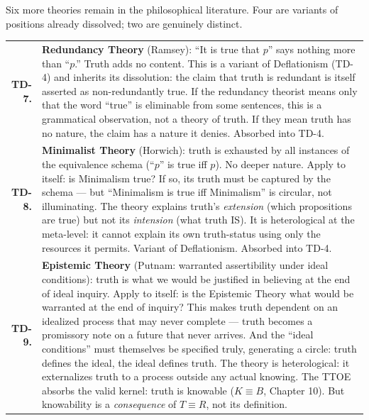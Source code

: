 \documentclass[10pt, openany, oneside]{book}
\renewcommand{\footnotesize}{\fontsize{8.5}{11}\selectfont}
\begin{document}
\vspace{0.8em}

\noindent Six more theories remain in the philosophical literature. Four are variants of positions already dissolved; two are genuinely distinct.

{\footnotesize
\noindent\begin{tabular}{r p{}}
\textbf{TD-7.} & \textbf{Redundancy Theory} (Ramsey): ``It is true that $p$'' says nothing more than ``$p$.'' Truth adds no content. This is a variant of Deflationism (TD-4) and inherits its dissolution: the claim that truth is redundant is itself asserted as non-redundantly true. If the redundancy theorist means only that the word ``true'' is eliminable from some sentences, this is a grammatical observation, not a theory of truth. If they mean truth has no nature, the claim has a nature it denies. Absorbed into TD-4. \\[0.3em]
\textbf{TD-8.} & \textbf{Minimalist Theory} (Horwich): truth is exhausted by all instances of the equivalence schema (``$p$'' is true iff $p$). No deeper nature. Apply to itself: is Minimalism true? If so, its truth must be captured by the schema --- but ``Minimalism is true iff Minimalism'' is circular, not illuminating. The theory explains truth's \textit{extension} (which propositions are true) but not its \textit{intension} (what truth IS). It is heterological at the meta-level: it cannot explain its own truth-status using only the resources it permits. Variant of Deflationism. Absorbed into TD-4. \\[0.3em]
\textbf{TD-9.} & \textbf{Epistemic Theory} (Putnam: warranted assertibility under ideal conditions): truth is what we would be justified in believing at the end of ideal inquiry. Apply to itself: is the Epistemic Theory what would be warranted at the end of inquiry? This makes truth dependent on an idealized process that may never complete --- truth becomes a promissory note on a future that never arrives. And the ``ideal conditions'' must themselves be specified truly, generating a circle: truth defines the ideal, the ideal defines truth. The theory is heterological: it externalizes truth to a process outside any actual knowing. The TTOE absorbs the valid kernel: truth is knowable ($K \equiv B$, Chapter 10). But knowability is a \textit{consequence} of $T \equiv R$, not its definition. \\[0.3em]
\end{tabular}
}

\vspace{0.5em}
\end{document}
